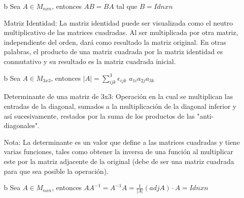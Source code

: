 \documentclass[letterpaper, 12pt]{article}
\begin{document}
\begin{itemize}
    Multiplicaci\'on entre dos matrices: La multiplicaci''on entre matrices puede ser definida como la suma de la multiplicaci\'on "entrada por entrada" del rengl\'on de la primera por la columna de la segunda. En pocas palabras, se multiplica el elemento del rengl\'on con el elemento de la columna correspondiente, para luego sumar el resultado. Por ejemplo $a_{11}b_{11} + a_{12}b_{21}... a_{1m}b_{m1}$. Una vez completada la suma, se realiza la misma operaci\'on, pero con la siguiente columna de la segunda matriz, hasta haber realizado la operaci\'on con todas las columnas. Seguido de esto, se realiza la misma operaci\'on, pero ahora con el segundo rengl\'on de la primera, hasta haber multiplicado cada columna de la segunda por cada rengl\'on de la primera. \newline

    Nota: El producto entre matrices no es conmutativo.
    
    \item[b] Sea $A \in M_{nxn}$, entonces $AB = BA$ tal que $B = Id{nxn}$ \newline

    Matriz Identidad: La matriz identidad puede ser visualizada como el neutro multiplicativo de las matrices cuadradas. Al ser multiplicada por otra matriz, independiente del orden, dar\'a como resultado la matriz original. En otras palabras, el producto de una matriz cuadrada por la matriz identidad es conmutativo y su resultado es la matriz cuadrada inicial. \newline
    
    \item[b] Sea $A \in M_{3x3}$, entonces $|A| = \displaystyle \sum_{ijk}^{3} \epsilon_{ijk}$ $a_{1i}a_{2j}a_{3k}$ \newline

    Determinante de una matriz de 3x3: Operaci\'on en la cual se multiplican las entradas de la diagonal, sumados a la multiplicaci\'on de la diagonal inferior y as\'i sucesivamente, restados por la suma de los productos de las "anti-diagonales". \newline
    
    Nota: La determinante es un valor que define a las matrices cuadradas y tiene varias funciones, tales como obtener la inversa de una funci\'on al multiplicar este por la matriz adjacente de la original (debe de ser una matriz cuadrada para que sea posible la operaci\'on). \newline
    
    \item[b] Sea $A\in M_{nxn}$, entonces $AA^{-1} = A^{-1}A = \frac{1}{|A|}(adj A) \cdot A = Id{nxn}$\newline


\end{itemize}
\end{document}
